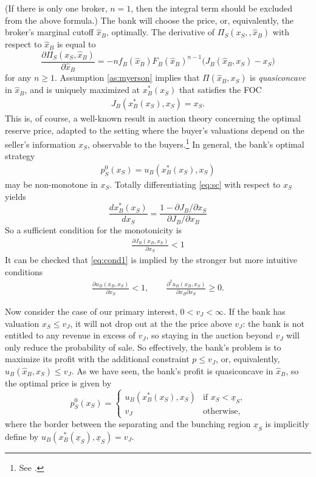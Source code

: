 \documentclass[11pt,twopage]{article}
\newcommand{\ul}{\underline}
\begin{document}
(If there is only one broker, $n=1$, then the integral term should be
excluded from the above formula.) The bank will choose the price, or,
equivalently, the broker's marginal cutoff $\hat x_B$, optimally. The
derivative of $\Pi_S (x_S,,\hat x_B)$ with respect to $\hat x_B$ is
equal to
\[ \frac{\partial \Pi_S (x_S,\hat x_B)}{\partial \hat x_B} = -nf_B(\hat
x_B) F_B(\hat x_B)^{n-1} \Big ( J_B(\hat x_B,x_S) - x_S \Big)
\]
for any $n\geq 1$. Assumption \ref{as:myerson} implies that $\Pi (\hat
x_B,x_S)$ is \emph{quasiconcave} in $\hat x_B$, and is uniquely
maximized at $x_B^*(x_S)$ that satisfies the FOC
\begin{align} J_B(x_B^*(x_S),x_S) = x_S . \label{eq:sc} \end{align}
This is, of course, a well-known result in auction theory concerning
the optimal reserve price, adapted to the setting where the buyer's
valuations depend on the seller's information $x_S$, observable to the
buyers.\footnote{See \cite{myerson1981optimal}.}  In general, the
bank's optimal strategy
\begin{align}
  p_S^0(x_S) = u_B(x_B^*(x_S), x_S) \label{eq:ps0-below-vJ}
\end{align}
may be non-monotone in $x_S$. Totally differentiating \eqref{eq:sc}
with respect to $x_S$ yields
\[ \frac{d x_B^*(x_S)}{dx_S} = \frac{1-\partial J_B/\partial
  x_S}{\partial J_B/\partial x_B} \] So a sufficient condition for the
monotonicity is \begin{align} \frac{\partial J_B(x_B,x_S)}{\partial
    x_S} < 1 \label{eq:cond1}
\end{align}
It can be checked that \eqref{eq:cond1} is implied by the stronger but
more intuitive conditions
\begin{align}
  \frac{\partial u_B(x_B,x_S)}{\partial x_S} <1,\quad \quad
  \frac{\partial^2 u_B(x_B,x_S)}{\partial x_B \partial x_S } \geq 0.
  \label{eq:cond2}
\end{align}

Now consider the case of our primary interest, $0<v_J<\infty$. If the
bank has valuation $x_S \leq v_J$, it will not drop out at the the
price above $v_J$: the bank is not entitled to any revenue in excess
of $v_J$, so staying in the auction beyond $v_J$ will only reduce the
probability of sale. So effectively, the bank's problem is to maximize
its profit with the additional constraint $p \leq v_J$, or,
equivalently, $u_B(\hat x_B,x_S) \leq v_J$. As we have seen, the
bank's profit is quasiconcave in $\hat x_B$, so the optimal price is
given by
\[
p_S^0(x_S)= \begin{cases}
  u_B(x_B^*(x_S),x_S) & \text{if $x_S<\ul x_S$,} \\
  v_J & \text{otherwise,}
\end{cases}
\]
where the border between the separating and the bunching region $\ul
x_S$ is implicitly define by $u_B(x_B^*(\ul x_S),\ul x_S)=v_J$.
\end{document}
